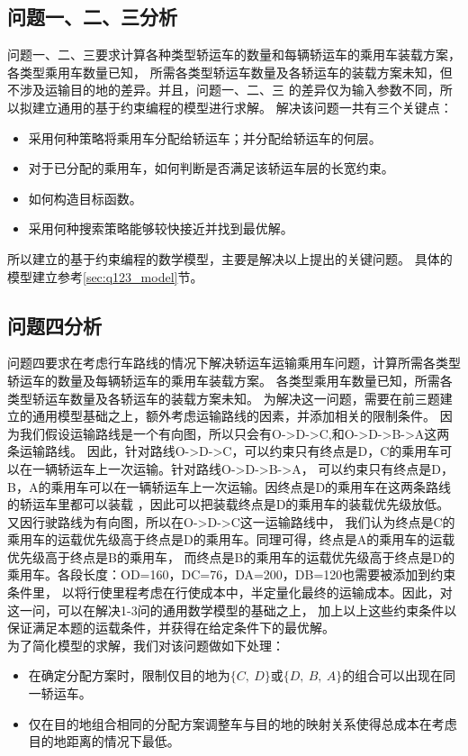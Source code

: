 \documentclass[UTF8]{ctexart}
\begin{document}
\subsection{问题一、二、三分析}
问题一、二、三要求计算各种类型轿运车的数量和每辆轿运车的乘用车装载方案，各类型乘用车数量已知，
所需各类型轿运车数量及各轿运车的装载方案未知，但不涉及运输目的地的差异。并且，问题一、二、三
的差异仅为输入参数不同，所以拟建立通用的基于约束编程的模型进行求解。
解决该问题一共有三个关键点：
\begin{itemize}
	\item 采用何种策略将乘用车分配给轿运车；并分配给轿运车的何层。
	\item 对于已分配的乘用车，如何判断是否满足该轿运车层的长宽约束。
	\item 如何构造目标函数。
	\item 采用何种搜索策略能够较快接近并找到最优解。
\end{itemize}
所以建立的基于约束编程的数学模型，主要是解决以上提出的关键问题。
具体的模型建立参考\ref{sec:q123_model}节。




\subsection{问题四分析}
问题四要求在考虑行车路线的情况下解决轿运车运输乘用车问题，计算所需各类型轿运车的数量及每辆轿运车的乘用车装载方案。
各类型乘用车数量已知，所需各类型轿运车数量及各轿运车的装载方案未知。
为解决这一问题，需要在前三题建立的通用模型基础之上，额外考虑运输路线的因素，并添加相关的限制条件。
因为我们假设运输路线是一个有向图，所以只会有O->D->C,和O->D->B->A这两条运输路线。
因此，针对路线O->D->C，可以约束只有终点是D，C的乘用车可以在一辆轿运车上一次运输。针对路线O->D->B->A，
可以约束只有终点是D，B，A的乘用车可以在一辆轿运车上一次运输。因终点是D的乘用车在这两条路线的轿运车里都可以装载
，因此可以把装载终点是D的乘用车的装载优先级放低。又因行驶路线为有向图，所以在O->D->C这一运输路线中，
我们认为终点是C的乘用车的运载优先级高于终点是D的乘用车。同理可得，终点是A的乘用车的运载优先级高于终点是B的乘用车，
而终点是B的乘用车的运载优先级高于终点是D的乘用车。各段长度：OD=160，DC=76，DA=200，DB=120也需要被添加到约束条件里，
以将行使里程考虑在行使成本中，半定量化最终的运输成本。因此，对这一问，可以在解决1-3问的通用数学模型的基础之上，
加上以上这些约束条件以保证满足本题的运载条件，并获得在给定条件下的最优解。\\
为了简化模型的求解，我们对该问题做如下处理：
\begin{itemize}
	\item 在确定分配方案时，限制仅目的地为$\{C,~D\}$或$\{D,~B,~A\}$的组合可以出现在同一轿运车。
	\item 仅在目的地组合相同的分配方案调整车与目的地的映射关系使得总成本在考虑目的地距离的情况下最低。
\end{itemize}
\end{document}

